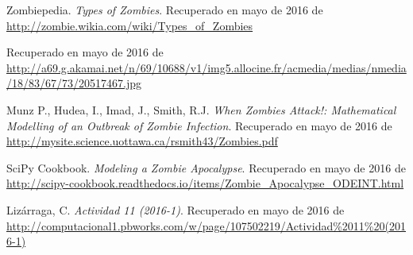 \documentclass[12pt]{article}
\begin{document}
\begin{thebibliography}{6}

Zombiepedia.
\emph{Types of Zombies}. Recuperado en mayo de 2016 de \url{http://zombie.wikia.com/wiki/Types_of_Zombies}

Recuperado en mayo de 2016 de \url{http://a69.g.akamai.net/n/69/10688/v1/img5.allocine.fr/acmedia/medias/nmedia/18/83/67/73/20517467.jpg}

Munz P., Hudea, I., Imad, J., Smith, R.J.
\emph{When Zombies Attack!: Mathematical Modelling of an Outbreak of Zombie Infection}. Recuperado en mayo de 2016 de \url{http://mysite.science.uottawa.ca/rsmith43/Zombies.pdf}

SciPy Cookbook.
\emph{Modeling a Zombie Apocalypse}. Recuperado en mayo de 2016 de \url{http://scipy-cookbook.readthedocs.io/items/Zombie_Apocalypse_ODEINT.html}

Lizárraga, C.
\emph{Actividad 11 (2016-1)}. Recuperado en mayo de 2016 de \url{http://computacional1.pbworks.com/w/page/107502219/Actividad\%2011\%20(2016-1)}

\end{thebibliography}
\end{document}
